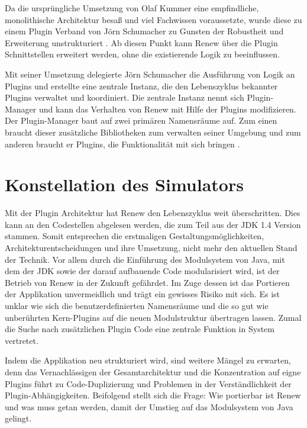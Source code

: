 Da die ursprüngliche Umsetzung von Olaf Kummer eine empfindliche, monolithische Architektur besaß und viel Fachwissen voraussetzte, wurde diese zu einem Plugin Verband von Jörn Schumacher zu Gunsten der Robustheit und Erweiterung unstrukturiert \cite{schummacher}. Ab diesen Punkt kann Renew über die Plugin Schnittstellen erweitert werden, ohne die existierende Logik zu beeinflussen.\bigbreak

Mit seiner Umsetzung delegierte Jörn Schumacher die Ausführung von Logik an Plugins und erstellte eine zentrale Instanz, die den Lebenszyklus bekannter Plugins verwaltet und koordiniert. Die zentrale Instanz nennt sich Plugin-Manager und kann das Verhalten von Renew mit Hilfe der Plugins modifizieren. Der Plugin-Manager baut auf zwei primären Namensräume auf. Zum einen braucht dieser zusätzliche Bibliotheken zum verwalten seiner Umgebung und zum anderen braucht er Plugins, die Funktionalität mit sich bringen \cite{douvigneau}.

\section{Konstellation des Simulators} \label{sec:KdS}

Mit der Plugin Architektur hat Renew den Lebenszyklus weit überschritten. Dies kann an den Codestellen abgelesen werden, die zum Teil aus der JDK 1.4 Version stammen. Somit entsprechen die erstmaligen Gestaltungsmöglichkeiten, Architekturentscheidungen und ihre Umsetzung, nicht mehr den aktuellen Stand der Technik. Vor allem durch die Einführung des Modulsystem von Java, mit dem der JDK sowie der darauf aufbauende Code modularisiert wird, ist der Betrieb von Renew in der Zukunft gefährdet. Im Zuge dessen ist das Portieren der Applikation unvermeidlich und trägt ein gewisses Risiko mit sich. Es ist unklar wie sich die benutzerdefinierten Namensräume und die so gut wie unberührten Kern-Plugins auf die neuen Modulstruktur übertragen lassen. Zumal die Suche nach zusätzlichen Plugin Code eine zentrale Funktion in System vertretet.\bigbreak

Indem die Applikation neu strukturiert wird, sind weitere Mängel zu erwarten, denn das Vernachlässigen der Gesamtarchitektur und die Konzentration auf eigne Plugins führt zu Code-Duplizierung und Problemen in der Verständlichkeit der Plugin-Abhängigkeiten.\newline
Beifolgend stellt sich die Frage: Wie portierbar ist Renew und was muss getan werden, damit der Umstieg auf das Modulsystem von Java gelingt.

